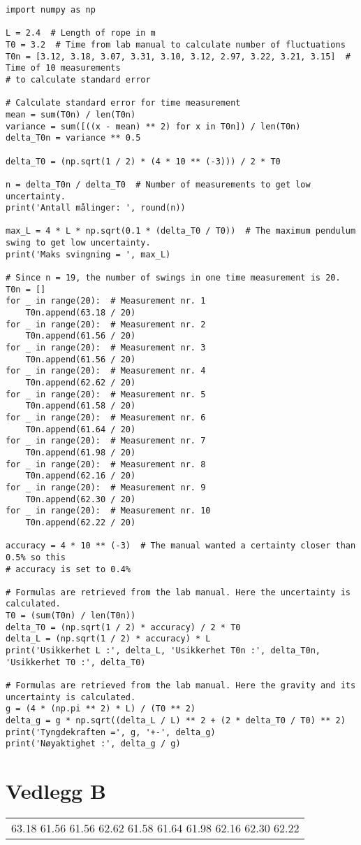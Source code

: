 \documentclass[twocolumn, 11pt]{article} %
\begin{document}
\begin{lstlisting}
import numpy as np

L = 2.4  # Length of rope in m
T0 = 3.2  # Time from lab manual to calculate number of fluctuations
T0n = [3.12, 3.18, 3.07, 3.31, 3.10, 3.12, 2.97, 3.22, 3.21, 3.15]  # Time of 10 measurements
# to calculate standard error

# Calculate standard error for time measurement
mean = sum(T0n) / len(T0n)
variance = sum([((x - mean) ** 2) for x in T0n]) / len(T0n)
delta_T0n = variance ** 0.5

delta_T0 = (np.sqrt(1 / 2) * (4 * 10 ** (-3))) / 2 * T0

n = delta_T0n / delta_T0  # Number of measurements to get low uncertainty.
print('Antall målinger: ', round(n))

max_L = 4 * L * np.sqrt(0.1 * (delta_T0 / T0))  # The maximum pendulum swing to get low uncertainty.
print('Maks svingning = ', max_L)

# Since n = 19, the number of swings in one time measurement is 20.
T0n = []
for _ in range(20):  # Measurement nr. 1
    T0n.append(63.18 / 20)
for _ in range(20):  # Measurement nr. 2
    T0n.append(61.56 / 20)
for _ in range(20):  # Measurement nr. 3
    T0n.append(61.56 / 20)
for _ in range(20):  # Measurement nr. 4
    T0n.append(62.62 / 20)
for _ in range(20):  # Measurement nr. 5
    T0n.append(61.58 / 20)
for _ in range(20):  # Measurement nr. 6
    T0n.append(61.64 / 20)
for _ in range(20):  # Measurement nr. 7
    T0n.append(61.98 / 20)
for _ in range(20):  # Measurement nr. 8
    T0n.append(62.16 / 20)
for _ in range(20):  # Measurement nr. 9
    T0n.append(62.30 / 20)
for _ in range(20):  # Measurement nr. 10
    T0n.append(62.22 / 20)

accuracy = 4 * 10 ** (-3)  # The manual wanted a certainty closer than 0.5% so this
# accuracy is set to 0.4%

# Formulas are retrieved from the lab manual. Here the uncertainty is calculated.
T0 = (sum(T0n) / len(T0n))
delta_T0 = (np.sqrt(1 / 2) * accuracy) / 2 * T0
delta_L = (np.sqrt(1 / 2) * accuracy) * L
print('Usikkerhet L :', delta_L, 'Usikkerhet T0n :', delta_T0n, 'Usikkerhet T0 :', delta_T0)

# Formulas are retrieved from the lab manual. Here the gravity and its uncertainty is calculated.
g = (4 * (np.pi ** 2) * L) / (T0 ** 2)
delta_g = g * np.sqrt((delta_L / L) ** 2 + (2 * delta_T0 / T0) ** 2)
print('Tyngdekraften =', g, '+-', delta_g)
print('Nøyaktighet :', delta_g / g)

\end{lstlisting}

\clearpage
\newpage
\section{Vedlegg B}
\label{RådataVedlegg}

\begin{longtable}{l}

63.18
61.56
61.56
62.62
61.58
61.64
61.98
62.16
62.30
62.22
      
\end{longtable}
\end{document}
